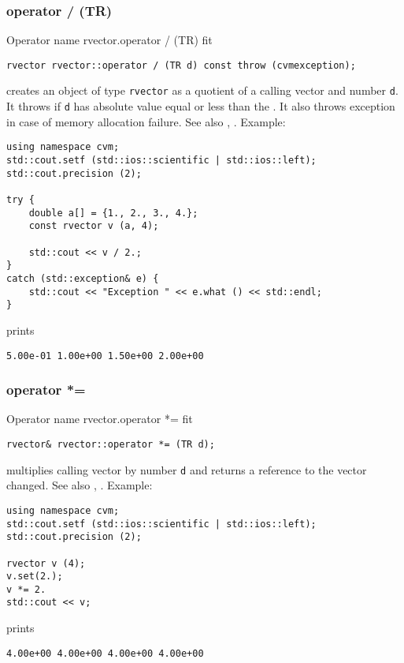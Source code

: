 \subsubsection{operator / (TR)}
Operator%
\pdfdest name {rvector.operator / (TR)} fit
\begin{verbatim}
rvector rvector::operator / (TR d) const throw (cvmexception);
\end{verbatim}
creates an object of type \verb"rvector" as a quotient of
a calling vector and number \verb"d". It throws
if \verb"d" has  absolute value equal or less
than the 
.
It also throws exception
in case of memory allocation failure.
See also ,
.
Example:
\begin{Verbatim}
using namespace cvm;
std::cout.setf (std::ios::scientific | std::ios::left); 
std::cout.precision (2);

try {
    double a[] = {1., 2., 3., 4.};
    const rvector v (a, 4);

    std::cout << v / 2.;
}
catch (std::exception& e) {
    std::cout << "Exception " << e.what () << std::endl;
}
\end{Verbatim}
prints
\begin{Verbatim}
5.00e-01 1.00e+00 1.50e+00 2.00e+00
\end{Verbatim}
\newpage


\subsubsection{operator *=}
Operator%
\pdfdest name {rvector.operator *=} fit
\begin{verbatim}
rvector& rvector::operator *= (TR d);
\end{verbatim}
multiplies calling vector by number \verb"d"
and returns a reference to
the vector changed.
See also ,
.
Example:
\begin{Verbatim}
using namespace cvm;
std::cout.setf (std::ios::scientific | std::ios::left); 
std::cout.precision (2);

rvector v (4);
v.set(2.);
v *= 2.
std::cout << v;
\end{Verbatim}
prints
\begin{Verbatim}
4.00e+00 4.00e+00 4.00e+00 4.00e+00
\end{Verbatim}
\newpage


